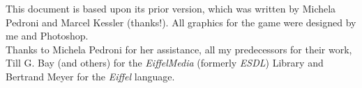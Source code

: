 This document is based upon its prior version, which was written by Michela Pedroni and Marcel Kessler (thanks!). All graphics for the game were designed by me and Photoshop.\\

Thanks to Michela Pedroni for her assistance, all my predecessors for their work, Till G. Bay (and others) for the \emph{EiffelMedia} (formerly \emph{ESDL}) Library and Bertrand Meyer for the \emph{Eiffel} language.
